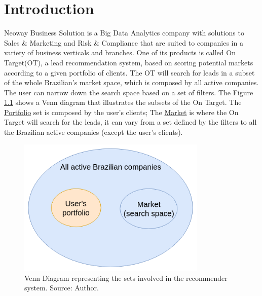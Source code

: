 \chapter{Introduction} 
\label{ch:introduction}

\fancyhead[ER]{\sffamily\footnotesize{\leftmark}}
\fancyhead[OL]{\sffamily\footnotesize{\rightmark}}

Neoway Business Solution is a Big Data Analytics company with solutions to Sales \& Marketing and Risk \& Compliance that are suited to companies in a variety of business verticals and branches. One of its products is called On Target(OT), a lead recommendation system, based on scoring potential markets according to a given portfolio of clients. The OT will search for leads in a subset of the whole Brazilian's market space, which is composed by all active companies. The user can narrow down the search space based on a set of filters. The Figure \ref{fig:braz-comps-venn-diagram} shows a Venn diagram that illustrates the subsets of the On Target. The \underline{Portfolio} set is composed by the user's clients; The \underline{Market} is where the On Target will search for the leads, it can vary from a set defined by the filters to all the Brazilian active companies (except the user's clients).

\begin{figure}[h]
   \centering
   \includegraphics[width=9cm]{fig/ch1-brazil-comps-venn-diagram.png}
   \caption{Venn Diagram representing the sets involved in the recommender system. Source: Author.}
   \label{fig:braz-comps-venn-diagram}
\end{figure}

